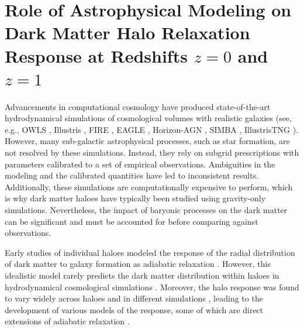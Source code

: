 \chapter[Role of Astrophysical Modeling on Dark Matter Halo Relaxation Response at Redshifts z=0 and z=1]{Role of Astrophysical Modeling on Dark Matter Halo Relaxation Response at Redshifts $z=0$ and $z=1$}
\label{chap:physvar_z01}

Advancements in computational cosmology have produced state-of-the-art hydrodynamical simulations of cosmological volumes with realistic galaxies (see, e.g., OWLS \citep{2010MNRAS.402.1536S}, Illustris \citep{2014MNRAS.445..175G}, FIRE \citep{2014MNRAS.445..581H}, EAGLE \citep{2015MNRAS.446..521S}, Horizon-AGN \citep[][]{2017MNRAS.467.4739K}, SIMBA \citep[][]{2019MNRAS.486.2827D}, IllustrisTNG \citep{2019ComAC...6....2N}). However, many sub-galactic astrophysical processes, such as star formation, are not resolved by these simulations. Instead, they rely on subgrid prescriptions with parameters calibrated to a set of empirical observations. Ambiguities in the modeling and the calibrated quantities have led to inconsistent results. Additionally, these simulations are computationally expensive to perform, which is why dark matter haloes have typically been studied using gravity-only simulations. Nevertheless, the impact of baryonic processes on the dark matter can be significant and must be accounted for before comparing against observations.

Early studies of individual haloes modeled the response of the radial distribution of dark matter to galaxy formation as adiabatic relaxation \citep[][]{osti6457593,1984MNRAS.211..753B,1986ApJ...301...27B,1987ApJ...318...15R}. However, this idealistic model rarely predicts the dark matter distribution within haloes in hydrodynamical cosmological simulations \citep[e.g.,][]{2004ApJ...616...16G,2010MNRAS.407..435A}. Moreover, the halo response was found to vary widely across haloes and in different simulations \citep[][]{2004ApJ...616...16G,2006PhRvD..74l3522G,2010MNRAS.402..776P,2010MNRAS.406..922T,2010MNRAS.405.2161D,2010MNRAS.407..435A,2011MNRAS.414..195T,2016MNRAS.461.2658D,2019A&A...622A.197A,2022MNRAS.511.3910F,2023Velmani&Paranjape}, leading to the development of various models of the response, some of which are direct extensions of adiabatic relaxation \citep[e.g.,][]{2004ApJ...616...16G,2006PhRvD..74l3522G,2010MNRAS.407..435A}. 

